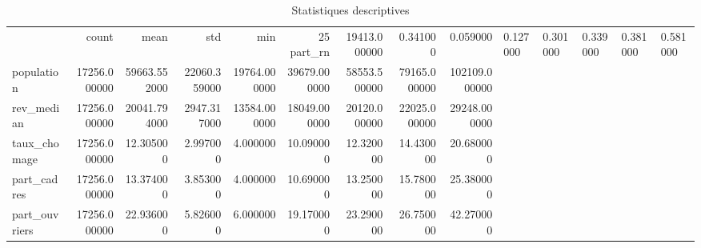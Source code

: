\begin{table}
\caption{Statistiques descriptives}
\label{tab:desc}
\begin{tabular}{lrrrrrrrr}
\toprule
 & count & mean & std & min & 25%
\midrule
part_rn & 19413.000000 & 0.341000 & 0.059000 & 0.127000 & 0.301000 & 0.339000 & 0.381000 & 0.581000 \\
population & 17256.000000 & 59663.552000 & 22060.359000 & 19764.000000 & 39679.000000 & 58553.500000 & 79165.000000 & 102109.000000 \\
rev_median & 17256.000000 & 20041.794000 & 2947.317000 & 13584.000000 & 18049.000000 & 20120.000000 & 22025.000000 & 29248.000000 \\
taux_chomage & 17256.000000 & 12.305000 & 2.997000 & 4.000000 & 10.090000 & 12.320000 & 14.430000 & 20.680000 \\
part_cadres & 17256.000000 & 13.374000 & 3.853000 & 4.000000 & 10.690000 & 13.250000 & 15.780000 & 25.380000 \\
part_ouvriers & 17256.000000 & 22.936000 & 5.826000 & 6.000000 & 19.170000 & 23.290000 & 26.750000 & 42.270000 \\
\bottomrule
\end{tabular}
\end{table}
